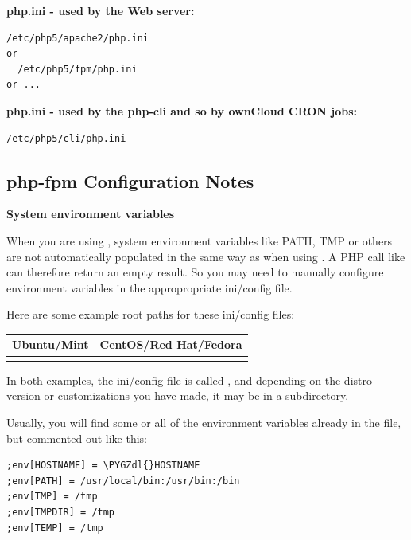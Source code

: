 \documentclass[letterpaper,10pt,english]{sphinxmanual}
\def\PYGZdl{\char`\$}
\begin{document}
\textbf{php.ini - used by the Web server:}

\begin{Verbatim}[commandchars=\\\{\}]
  /etc/php5/apache2/php.ini
or
  /etc/php5/fpm/php.ini
or ...
\end{Verbatim}

\textbf{php.ini - used by the php-cli and so by ownCloud CRON jobs:}

\begin{Verbatim}[commandchars=\\\{\}]
/etc/php5/cli/php.ini
\end{Verbatim}


\subsection{php-fpm Configuration Notes}
\label{installation/source_installation:php-fpm-tips-label}\label{installation/source_installation:php-fpm-configuration-notes}
\textbf{System environment variables}

When you are using , system environment variables like
PATH, TMP or others are not automatically populated in the same way as
when using . A PHP call like  can therefore
return an empty result. So you may need to manually configure environment
variables in the appropropriate  ini/config file.

Here are some example root paths for these ini/config files:

\begin{tabulary}{\linewidth}{|L|L|}
\hline

Ubuntu/Mint
 & 
CentOS/Red Hat/Fedora
\\
\hline
{}
 & 
\\
\hline\end{tabulary}


In both examples, the ini/config file is called , and depending on
the distro version or customizations you have made, it may be in a subdirectory.

Usually, you will find some or all of the environment variables
already in the file, but commented out like this:

\begin{Verbatim}[commandchars=\\\{\}]
;env[HOSTNAME] = \PYGZdl{}HOSTNAME
;env[PATH] = /usr/local/bin:/usr/bin:/bin
;env[TMP] = /tmp
;env[TMPDIR] = /tmp
;env[TEMP] = /tmp
\end{Verbatim}
\end{document}
